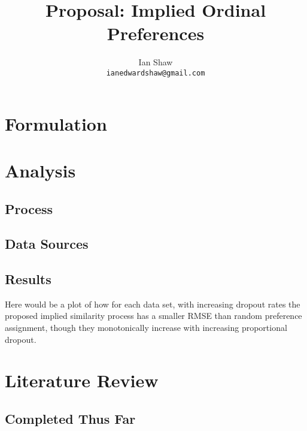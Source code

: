\documentclass{article}
\title{Proposal: Implied Ordinal Preferences}
\author{Ian Shaw \\ \texttt{ianedwardshaw@gmail.com}}
\begin{document}
\maketitle

\begin{abstract}

\end{abstract}


\newpage

\tableofcontents

\newpage

\section{Formulation}



\section{Analysis}

\subsection{Process}



\subsection{Data Sources}



\subsection{Results}

Here would be a plot of how for each data set, with increasing dropout rates the proposed implied similarity process has a smaller RMSE than random preference assignment, though they monotonically increase with increasing proportional dropout.

\section{Literature Review}

\subsection{Completed Thus Far}
\end{document}

